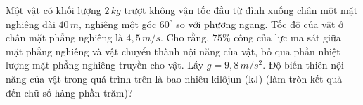 \begin{ex}
Một vật có khối lượng $2 \, kg$ trượt không vận tốc đầu từ đỉnh xuống chân một mặt nghiêng dài $40 \, m$, nghiêng một góc $60^\circ$ so với phương ngang. Tốc độ của vật ở chân mặt phẳng nghiêng là $4,5 \, m/s$. Cho rằng, $75\%$ công của lực ma sát giữa mặt phẳng nghiêng và vật chuyển thành nội năng của vật, bỏ qua phần nhiệt lượng mặt phẳng nghiêng truyền cho vật. Lấy $g = 9,8 \, m/s^2$. Độ biến thiên nội năng của vật trong quá trình trên là bao nhiêu kilôjun (kJ) (làm tròn kết quả đến chữ số hàng phần trăm)?

\end{ex}

